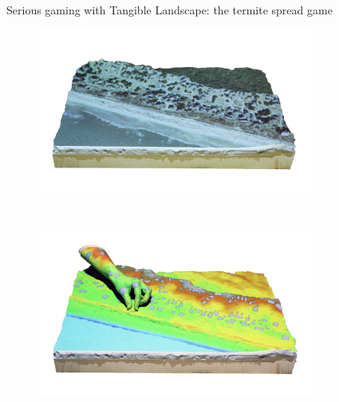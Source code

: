 \documentclass{article}
\begin{document}
\begin{figure}
\begin{subfigure}[t]{0.3\textwidth}
        \end{subfigure}
        \caption{Serious gaming with Tangible Landscape: the termite spread game}
        \label{fig:termite_game}
\end{figure}

\begin{figure}
        \centering
        \begin{subfigure}[t]{0.225\textwidth}
                \includegraphics[trim={0 0 0 1cm},clip,width=\textwidth]{tl_coastal_1s.png}
        \end{subfigure}
        ~ %
        \begin{subfigure}[t]{0.225\textwidth}
                \includegraphics[trim={0 0 0 1cm},clip,width=\textwidth]{tl_coastal_2s.png}

\end{subfigure}
\end{figure}
\end{document}
